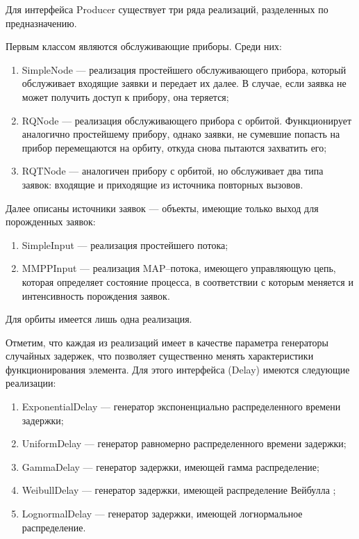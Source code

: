 Для интерфейса Producer существует три ряда реализаций, разделенных по предназначению. 

Первым классом являются обслуживающие приборы. Среди них:
\begin{enumerate}
	\item SimpleNode --- реализация простейшего обслуживающего прибора, который обслуживает входящие заявки и передает их далее. В случае, если заявка не может получить доступ к прибору, она теряется;
	\item RQNode --- реализация обслуживающего прибора с орбитой. Функционирует аналогично простейшему прибору, однако заявки, не сумевшие попасть на прибор перемещаются на орбиту, откуда снова пытаются захватить его;
	\item RQTNode --- аналогичен прибору с орбитой, но обслуживает два типа заявок: входящие и приходящие из источника повторных вызовов.
\end{enumerate}


Далее описаны источники заявок --- объекты, имеющие только выход для порожденных заявок:
\begin{enumerate}
	\item SimpleInput --- реализация простейшего потока;
	\item MMPPInput --- реализация MAP--потока, имеющего управляющую цепь, которая определяет состояние процесса, в соответствии с которым меняется и интенсивность порождения заявок.
\end{enumerate}

Для орбиты имеется лишь одна реализация.

Отметим, что каждая из реализаций имеет в качестве параметра генераторы случайных задержек, что позволяет существенно менять характеристики функционирования элемента. Для этого интерфейса (Delay) имеются следующие реализации:
\begin{enumerate}
	\item ExponentialDelay --- генератор экспоненциально распределенного времени задержки;
	\item UniformDelay --- генератор равномерно распределенного времени задержки;
	\item GammaDelay --- генератор задержки, имеющей гамма распределение;
 	\item WeibullDelay --- генератор задержки, имеющей распределение Вейбулла \cite{hallinan1993review};
 	\item LognormalDelay --- генератор задержки, имеющей логнормальное распределение.
\end{enumerate}

